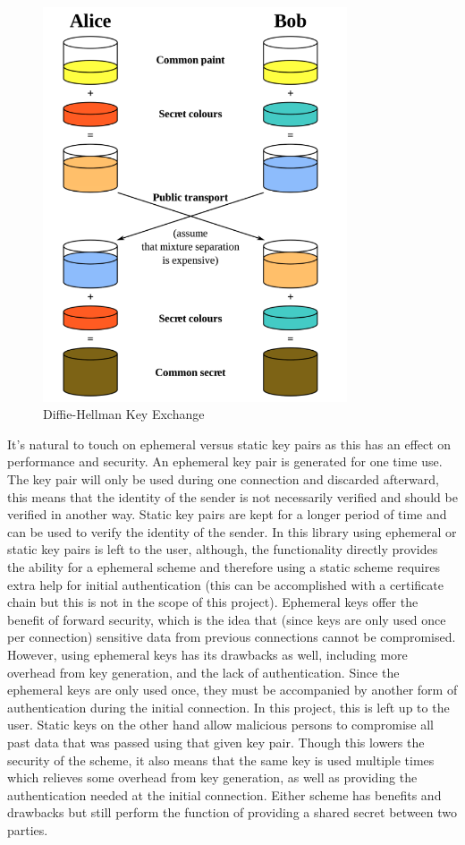  \begin{figure}[t]
	\centering
	\includegraphics[width=9cm,height=0.7\textheight,keepaspectratio]{./figures/figure_3}
	\center\caption[font=footnote]{Diffie-Hellman Key Exchange}
\end{figure}

It's natural to touch on ephemeral versus static key pairs as this has an effect on performance and security. An ephemeral key pair is generated for one time use. The key pair will only be used during one connection and discarded afterward, this means that the identity of the sender is not necessarily verified and should be verified in another way. Static key pairs are kept for a longer period of time and can be used to verify the identity of the sender. In this library using ephemeral or static key pairs is left to the user, although, the functionality directly provides the ability for a ephemeral scheme and therefore using a static scheme requires extra help for initial authentication (this can be accomplished with a certificate chain but this is not in the scope of this project). Ephemeral keys offer the benefit of forward security, which is the idea that (since keys are only used once per connection) sensitive data from previous connections cannot be compromised. However, using ephemeral keys has its drawbacks as well, including more overhead from key generation, and the lack of authentication. Since the ephemeral keys are only used once, they must be accompanied by another form of authentication during the initial connection. In this project, this is left up to the user. Static keys on the other hand allow malicious persons to compromise all past data that was passed using that given key pair. Though this lowers the security of the scheme, it also means that the same key is used multiple times which relieves some overhead from key generation, as well as providing the authentication needed at the initial connection. Either scheme has benefits and drawbacks but still perform the function of providing a shared secret between two parties.

